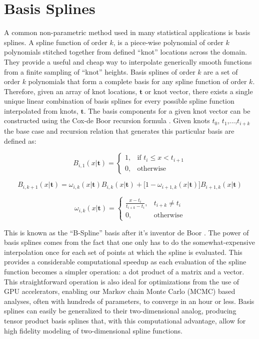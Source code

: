 \appendix
\section{Basis Splines} \label{sec:basis_splines}

A common non-parametric method used in many statistical applications is basis splines. A spline function of order $k$, 
is a piece-wise polynomial of order $k$ polynomials stitched together from defined ``knot'' locations across the domain. 
They provide a useful and cheap way to interpolate generically smooth functions from a finite sampling of ``knot'' heights. 
Basis splines of order $k$ are a set of order $k$ polynomials that form a complete basis for any spline function of order $k$. 
Therefore, given an array of knot locations, $\mathbf{t}$ or knot vector, there exists a single unique linear combination of basis splines 
for every possible spline function interpolated from knots, $\mathbf{t}$. The basis components for a given knot vector can be constructed  
using the Cox-de Boor recursion formula \citep{deBoor78,monotone_regression_splines}. Given knots $t_0$, $t_1$,...,$t_{i+k}$ 
the base case and recursion relation that generates this particular basis are defined as:

\begin{equation}
    B_{i,1}(x | \mathbf{t}) = 
    \begin{cases}
        1, & \text{if } t_i \leq x < t_{i+1} \\
        0, & \text{otherwise}
    \end{cases}
\end{equation}

\begin{equation}
    B_{i,k+1}(x | \mathbf{t}) = \omega_{i,k}(x | \mathbf{t})B_{i,k}(x | \mathbf{t}) + \big[1-\omega_{i+1,k}(x | \mathbf{t})\big] B_{i+1,k}(x | \mathbf{t})
\end{equation}

\begin{equation}
    \omega_{i,k}(x | \mathbf{t}) =
    \begin{cases}
        \frac{x-t_i}{t_{i+k}-t_i}, & t_{i+k} \neq t_i \\
        0, & \text{otherwise}
    \end{cases}
\end{equation}

\noindent This is known as the ``B-Spline'' basis after it's inventor de Boor \citep{deBoor78}. The power of basis splines
comes from the fact that one only has to do the somewhat-expensive interpolation once for each set of points at which the spline is evaluated. 
This provides a considerable computational speedup as each evaluation of the spline function becomes a simpler operation: a dot product of a 
matrix and a vector. This straightforward operation is also ideal for optimizations from the use of GPU accelerators, 
enabling our Markov chain Monte Carlo (MCMC) based analyses, often with hundreds of parameters, to converge in an hour or less. 
Basis splines can easily be generalized to their two-dimensional analog, producing tensor product basis splines that, 
with this computational advantage, allow for high fidelity modeling of two-dimensional spline functions.

